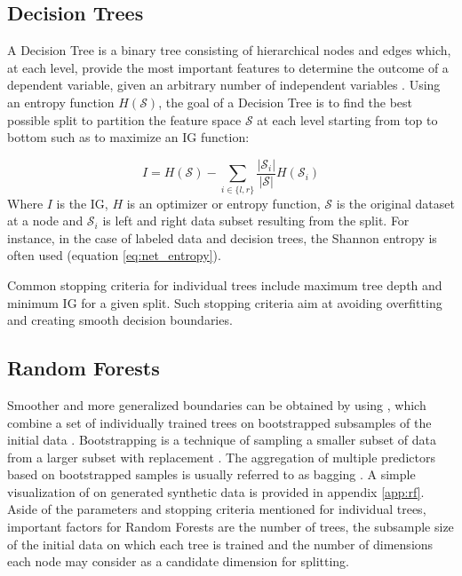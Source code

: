 \documentclass[10pt]{article}
\begin{document}
\subsection{Decision Trees}
A Decision Tree is a binary tree consisting of hierarchical nodes and edges which, at each level, provide the most important features to determine the outcome of a dependent variable, given an arbitrary number of independent variables \cite{decisionForests-MSR}. Using an entropy function $H(\mathcal{S})$, the goal of a Decision Tree is to find the best possible split to partition the feature space 
$\mathcal{S}$ at each level starting from top to bottom such as to maximize an \acrlong{IG} function:

\begin{equation}
    \label{eq:ig}
    I = H(\mathcal{S})-\sum_{i\in \{l,r\}}\frac{|\mathcal{S}_i|}{|\mathcal{S}|}H(\mathcal{S}_i)
\end{equation}
Where $I$ is the \acrlong{IG}, $H$ is an optimizer or entropy function, $\mathcal{S}$ is the original dataset at a node and $\mathcal{S}_i$ is left and right data subset resulting from the split. For instance, in the case of labeled data and decision trees, the Shannon entropy is often used (equation \ref{eq:net_entropy}).

Common stopping criteria for individual trees include maximum tree depth and minimum \gls{IG} for a given split. Such stopping criteria aim at avoiding overfitting and creating smooth decision boundaries.

\subsection{Random Forests}
Smoother and more generalized boundaries can be obtained by using , which combine a set of individually trained trees on bootstrapped subsamples of the initial data \cite{decisionForests-MSR, Breiman2001}. Bootstrapping is a technique of sampling a smaller subset of data from a larger subset with replacement \cite{Zoubir2007BootstrapMA}. The aggregation of multiple predictors based on bootstrapped samples is usually referred to as bagging \cite{Breiman1996BaggingP}. A simple visualization of  on generated synthetic data is provided in appendix \ref{app:rf}. Aside of the parameters and stopping criteria mentioned for individual trees, important factors for Random Forests are the number of trees, the subsample size of the initial data on which each tree is trained and the number of dimensions each node may consider as a candidate dimension for splitting.
\end{document}
